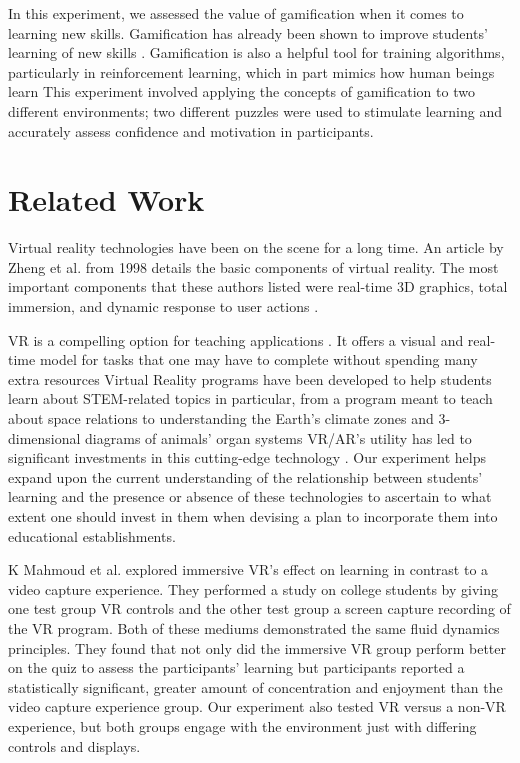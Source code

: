 \documentclass[manuscript,screen,review]{acmart}
\begin{document}
In this experiment, we assessed the value of gamification when it comes to learning new skills. Gamification has already been shown to improve students’ learning of new skills \cite{loureiro2020virtual, perez2022can, ausburn2008effects}. Gamification is also a helpful tool for training algorithms, particularly in reinforcement learning, which in part mimics how human beings learn \cite{agostinelli2019solving} This experiment involved applying the concepts of gamification to two different environments; two different puzzles were used to stimulate learning and accurately assess confidence and motivation in participants.

\section{Related Work}
Virtual reality technologies have been on the scene for a long time. An article by Zheng et al. \cite{zheng1998virtual} from 1998 details the basic components of virtual reality. The most important components that these authors listed were real-time 3D graphics, total immersion, and dynamic response to user actions \cite{zheng1998virtual}. 

VR is a compelling option for teaching applications \cite{mahmoud2020does, brown2019an, bricken1991virtual, villagrasa2014teaching}. It offers a visual and real-time model for tasks that one may have to complete without spending many extra resources \cite{mahmoud2020does} Virtual Reality programs have been developed to help students learn about STEM-related topics in particular, from a program meant to teach about space relations to understanding the Earth’s climate zones and 3-dimensional diagrams of animals’ organ systems \cite{oberdorfer2021mutual} VR/AR’s utility has led to significant investments in this cutting-edge technology \cite{martin2022multimodality, oberdorfer2021mutual}. Our experiment helps expand upon the current understanding of the relationship between students’ learning and the presence or absence of these technologies to ascertain to what extent one should invest in them when devising a plan to incorporate them into educational establishments.

K Mahmoud et al. \cite{mahmoud2020does} explored immersive VR’s effect on learning in contrast to a video capture experience. They performed a study on college students by giving one test group VR controls and the other test group a screen capture recording of the VR program. Both of these mediums demonstrated the same fluid dynamics principles. They found that not only did the immersive VR group perform better on the quiz to assess the participants’ learning but participants reported a statistically significant, greater amount of concentration and enjoyment than the video capture experience group. Our experiment also tested VR versus a non-VR experience, but both groups engage with the environment just with differing controls and displays.
\end{document}
